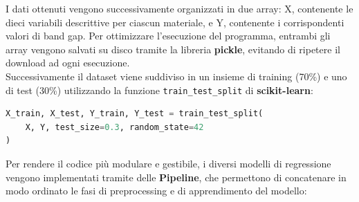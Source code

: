 \documentclass[a4paper,11pt]{article}
\begin{document}
I dati ottenuti vengono successivamente organizzati in due array: X, contenente le dieci variabili descrittive per ciascun materiale, e Y, contenente i corrispondenti valori di band gap. Per ottimizzare l’esecuzione del programma, entrambi gli array vengono salvati su disco tramite la libreria \textbf{pickle}, evitando di ripetere il download ad ogni esecuzione.\\

Successivamente il dataset viene suddiviso in un insieme di training (70\%) e uno di test (30\%) utilizzando la funzione \texttt{train\_test\_split} di \textbf{scikit-learn}:

\begin{lstlisting}[language=Python]
X_train, X_test, Y_train, Y_test = train_test_split(
    X, Y, test_size=0.3, random_state=42
)
\end{lstlisting}

Per rendere il codice più modulare e gestibile, i diversi modelli di regressione vengono implementati tramite delle \textbf{Pipeline}, che permettono di concatenare in modo ordinato le fasi di preprocessing e di apprendimento del modello:
\end{document}
